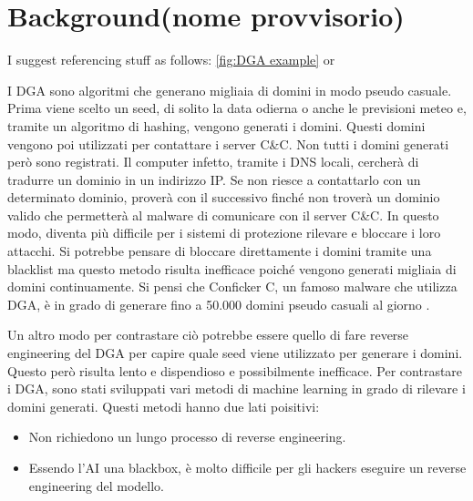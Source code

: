 \documentclass[12pt,a4paper,openright,twoside]{book}
\begin{document}

\chapter{Background(nome provvisorio)}

I suggest referencing stuff as follows: \cref{fig:DGA example} or 

I \acrshort{DGA} sono algoritmi che generano migliaia di domini in modo pseudo casuale.
Prima viene scelto un seed, di solito la data odierna
o anche le previsioni meteo \cite{8621875} e, tramite
un algoritmo di hashing, vengono generati i domini.
Questi domini vengono poi utilizzati per contattare i server \acrshort{C&C}.
Non tutti i domini generati però sono registrati.
Il computer infetto, tramite i DNS locali, cercherà di tradurre
un dominio in un indirizzo IP.
Se non riesce a contattarlo con un determinato dominio,
proverà con il successivo finché non troverà
un dominio valido che permetterà al malware di comunicare con
il server \acrshort{C&C}. \cite{8489147}
In questo modo, diventa più difficile per i sistemi di protezione
rilevare e bloccare i loro attacchi.
Si potrebbe pensare di bloccare direttamente i domini tramite
una blacklist ma questo metodo
risulta inefficace poiché vengono generati migliaia di domini
continuamente. Si pensi che Conficker C, un famoso malware
che utilizza \acrshort{DGA}, è in grado di generare
fino a 50.000 domini pseudo casuali al giorno \cite{978131}.

Un altro modo per contrastare ciò
potrebbe essere quello di fare reverse engineering
del \acrshort{DGA} per capire quale seed viene utilizzato per generare i domini.
Questo però risulta lento e dispendioso e possibilmente inefficace. \cite{8887881}
Per contrastare i \acrshort{DGA}, sono stati sviluppati
vari metodi di machine learning in grado di rilevare i domini generati.
Questi metodi hanno due lati poisitivi:
\begin{itemize}
    \item Non richiedono un lungo processo di reverse engineering.
    \item Essendo l'AI una blackbox, è molto difficile
    per gli hackers eseguire un reverse engineering del modello.
\end{itemize}
\end{document}
